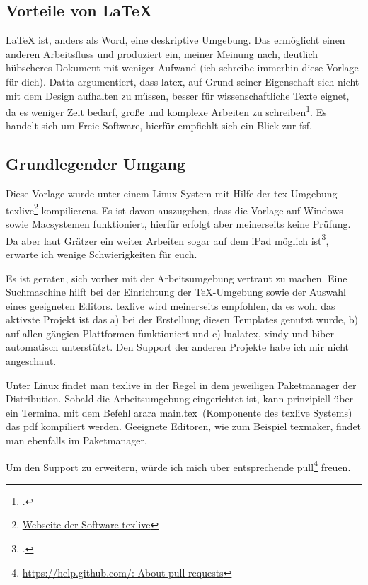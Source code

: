 \subsection{Vorteile von LaTeX}
\label{sec:vort-von}
LaTeX ist, anders als Word, eine deskriptive Umgebung. Das ermöglicht einen anderen Arbeitsfluss und produziert ein, meiner Meinung nach, deutlich hübscheres Dokument mit weniger Aufwand (ich schreibe immerhin diese Vorlage für dich). Datta argumentiert, dass \gls{latex}, auf Grund seiner Eigenschaft sich nicht mit dem Design aufhalten zu müssen, besser für wissenschaftliche Texte eignet, da es weniger Zeit bedarf, große und komplexe Arbeiten zu schreiben\footcite[vgl. ][Seite
1f.]{dilipLatex24Hours2017}.
Es handelt sich um Freie Software, hierfür empfiehlt sich ein Blick zur \gls{fsf}.

\subsection{Grundlegender Umgang}
\label{sec:grundl}
Diese Vorlage wurde unter einem Linux System mit Hilfe der tex-Umgebung texlive\footnote{\href{https://tug.org/texlive/}{Webseite der Software texlive}} \glspl{kompilieren}. Es ist davon auszugehen, dass die Vorlage auf Windows sowie Macsystemen funktioniert, hierfür erfolgt aber meinerseits keine Prüfung. Da aber laut Grätzer ein weiter Arbeiten sogar auf dem iPad möglich ist\footcite[vgl. ][S. 179ff.]{gratzerPracticalLatex2014}, erwarte ich wenige Schwierigkeiten für euch.

Es ist geraten, sich vorher mit der Arbeitsumgebung vertraut zu machen. Eine Suchmaschine hilft bei der Einrichtung der TeX-Umgebung sowie der Auswahl eines geeigneten Editors. texlive wird meinerseits empfohlen, da es wohl das aktivste Projekt ist das a) bei der Erstellung diesen Templates genutzt wurde, b) auf allen gängien Plattformen funktioniert und c) lualatex, xindy und biber automatisch unterstützt. Den Support der anderen Projekte habe ich mir nicht angeschaut.

Unter Linux findet man texlive in der Regel in dem jeweiligen Paketmanager der Distribution. Sobald die Arbeitsumgebung eingerichtet ist, kann prinzipiell über ein Terminal mit dem Befehl \glqq arara main.tex\grqq\ (Komponente des texlive Systems) das pdf kompiliert werden.
Geeignete Editoren, wie zum Beispiel texmaker, findet man ebenfalls im Paketmanager.

Um den Support zu erweitern, würde ich mich über entsprechende \gls{pull}\footnote{\href{https://help.github.com/en/articles/about-pull-requests}{https://help.github.com/: About pull requests}} freuen.


